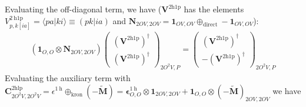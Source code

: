 Evaluating the off-diagonal term, we have ($\bm{V}^{2\mathrm{h1p}}$ has the  elements $V_{p, k[ia]}^{2 \mathrm{~h} 1 \mathrm{p}} = \langle p a | k i \rangle \equiv (pk|ia)$ and $\bm{N}_{2OV,2OV}=\bm{1}_{OV,OV} \oplus_{\text{direct}} -\bm{1}_{OV,OV}$):
\begin{align}
    \left( \bm{1}_{O,O} \otimes \bm{N}_{2OV,2OV} \right) \begin{pmatrix}
        \left(\bm{V}^{2\mathrm{h1p}}\right)^{\dagger} \\ \left( \bm{V}^{2\mathrm{h1p}}\right)^{\dagger}
    \end{pmatrix} _{2O^2V,P} =\begin{pmatrix}
        \left(\bm{V}^{2\mathrm{h1p}}\right)^{\dagger} \\ -\left( \bm{V}^{2\mathrm{h1p}}\right)^{\dagger}
    \end{pmatrix} _{2O^2V,P} 
\end{align} 
Evaluating the auxiliary term with $\bm{C}^{2\mathrm{hlp}}_{2O^2V,2O^2V} = \epsilon^{1 \mathrm{~h}} \oplus_{\text{kron}} (-\bm{\tilde{M}}) = \bm{\epsilon}^{1 \mathrm{~h}}_{O,O} \otimes \bm{1}_{2OV,2OV} + \bm{1}_{O,O} \otimes (-\bm{\tilde{M}})_{2OV,2OV}$ we have
